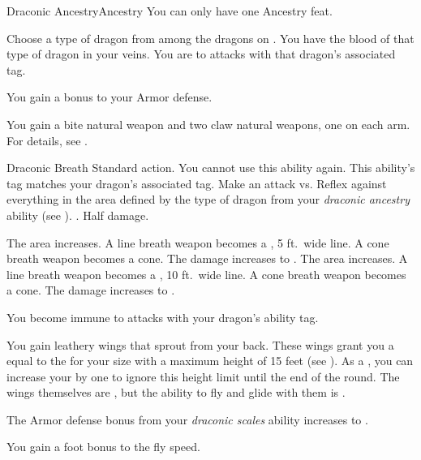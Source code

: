   \begin{feat}{Draconic Ancestry}{Ancestry}
     You can only have one Ancestry feat.

     Choose a type of dragon from among the dragons on .
    You have the blood of that type of dragon in your veins.
    You are  to attacks with that dragon's associated tag.

     You gain a  bonus to your Armor defense.

     You gain a bite natural weapon and two claw natural weapons, one on each arm.
    For details, see .

    \begin{activeability}{Draconic Breath}
      \abilityusagetime Standard action.
      \abilitycost You  cannot use this ability again.
      \rankline
      This ability's tag matches your dragon's associated tag.
      Make an attack vs. Reflex against everything in the area defined by the type of dragon from your \textit{draconic ancestry} ability (see ).
      \hit \damagerankthree.
      \miss Half damage.

      \rankline
       The area increases.
      A line breath weapon becomes a \arealarge, 5 ft.\ wide line.
      A cone breath weapon becomes a \areamed cone.
       The damage increases to \damagerankfive.
       The area increases.
      A line breath weapon becomes a \areahuge, 10 ft.\ wide line.
      A cone breath weapon becomes a \arealarge cone.
       The damage increases to \damagerankseven.
    \end{activeability}

     You become immune to attacks with your dragon's ability tag.

     You gain leathery wings that sprout from your back.
    These wings grant you a  equal to the  for your size with a maximum height of 15 feet (see ).
    As a , you can increase your  by one to ignore this height limit until the end of the round.
    The wings themselves are , but the ability to fly and glide with them is \magical.

     The Armor defense bonus from your \textit{draconic scales} ability increases to .

     You gain a  foot bonus to the fly speed.
  \end{feat}

